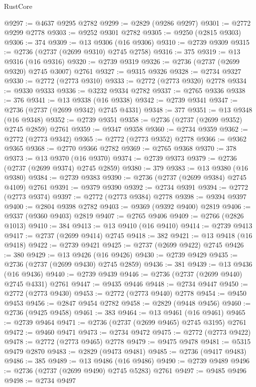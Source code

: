 \begin{lexlean}{RustCore}
\begin{coremodule}
@9297 := @4637 @9295 @2782
@9299 := @2829 (@9286 @9297)
@9301 := @2772 @9299 @2778
@9303 := @9252 @9301 @2782
@9305 := @9250 (@2815 @9303)
@9306 := 374
@9309 := @13 @9306 (@16 @9306)
@9310 := @2739 @9309
@9315 := @2736 (@2737 (@2699 @9310) @2745 @2758)
@9316 := 375
@9319 := @13 @9316 (@16 @9316)
@9320 := @2739 @9319
@9326 := @2736 (@2737 (@2699 @9320) @2745 @3007) @2761
@9327 := @9315 @9326
@9328 := @2734 @9327
@9330 := @2772 (@2773 @9310)
@9333 := @2772 (@2773 @9320) @2778
@9334 := @9330 @9333
@9336 := @3232 @9334 @2782
@9337 := @2765 @9336
@9338 := 376
@9341 := @13 @9338 (@16 @9338)
@9342 := @2739 @9341
@9347 := @2736 (@2737 (@2699 @9342) @2745 @4331)
@9348 := 377
@9351 := @13 @9348 (@16 @9348)
@9352 := @2739 @9351
@9358 := @2736 (@2737 (@2699 @9352) @2745 @2859) @2761
@9359 := @9347 @9358
@9360 := @2734 @9359
@9362 := @2772 (@2773 @9342)
@9365 := @2772 (@2773 @9352) @2778
@9366 := @9362 @9365
@9368 := @2770 @9366 @2782
@9369 := @2765 @9368
@9370 := 378
@9373 := @13 @9370 (@16 @9370)
@9374 := @2739 @9373
@9379 := @2736 (@2737 (@2699 @9374) @2745 @2859)
@9380 := 379
@9383 := @13 @9380 (@16 @9380)
@9384 := @2739 @9383
@9390 := @2736 (@2737 (@2699 @9384) @2745 @4109) @2761
@9391 := @9379 @9390
@9392 := @2734 @9391
@9394 := @2772 (@2773 @9374)
@9397 := @2772 (@2773 @9384) @2778
@9398 := @9394 @9397
@9400 := @2804 @9398 @2782
@9403 := @9369 (@9392 @9400) @2819
@9406 := @9337 (@9360 @9403) @2819
@9407 := @2765 @9406
@9409 := @2766 (@2826 @1013)
@9410 := 384
@9413 := @13 @9410 (@16 @9410)
@9414 := @2739 @9413
@9417 := @2737 (@2699 @9414) @2745
@9418 := 382
@9421 := @13 @9418 (@16 @9418)
@9422 := @2739 @9421
@9425 := @2737 (@2699 @9422) @2745
@9426 := 380
@9429 := @13 @9426 (@16 @9426)
@9430 := @2739 @9429
@9435 := @2736 (@2737 (@2699 @9430) @2745 @2859)
@9436 := 381
@9439 := @13 @9436 (@16 @9436)
@9440 := @2739 @9439
@9446 := @2736 (@2737 (@2699 @9440) @2745 @4331) @2761
@9447 := @9435 @9446
@9448 := @2734 @9447
@9450 := @2772 (@2773 @9430)
@9453 := @2772 (@2773 @9440) @2778
@9454 := @9450 @9453
@9456 := @2847 @9454 @2782
@9458 := @2829 (@9448 @9456)
@9460 := @2736 (@9425 @9458)
@9461 := 383
@9464 := @13 @9461 (@16 @9461)
@9465 := @2739 @9464
@9471 := @2736 (@2737 (@2699 @9465) @2745 @3195) @2761
@9472 := @9460 @9471
@9473 := @2734 @9472
@9475 := @2772 (@2773 @9422)
@9478 := @2772 (@2773 @9465) @2778
@9479 := @9475 @9478
@9481 := @5315 @9479 @2870
@9483 := @2829 (@9473 @9481)
@9485 := @2736 (@9417 @9483)
@9486 := 385
@9489 := @13 @9486 (@16 @9486)
@9490 := @2739 @9489
@9496 := @2736 (@2737 (@2699 @9490) @2745 @5283) @2761
@9497 := @9485 @9496
@9498 := @2734 @9497

\end{coremodule}
\end{lexlean}

